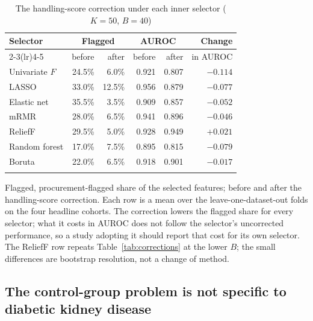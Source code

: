 \documentclass[unnumsec,webpdf,contemporary,large,numbered]{oup-authoring-template}
\begin{document}
\begin{table}[!t]
\caption{The handling-score correction under each inner selector ($K = 50$, $B = 40$)}\label{tab:sweep}
\tabcolsep=1.5pt
\begin{tabular*}{\columnwidth}{@{\extracolsep\fill}lrrrrr@{\extracolsep\fill}}
\toprule
Selector & \multicolumn{2}{c}{Flagged} & \multicolumn{2}{c}{AUROC} & Change \\
\cmidrule(lr){2-3}\cmidrule(lr){4-5}
 & before & after & before & after & in AUROC \\
\midrule
Univariate $F$ & 24.5\% & 6.0\%  & 0.921 & 0.807 & $-0.114$ \\
LASSO          & 33.0\% & 12.5\% & 0.956 & 0.879 & $-0.077$ \\
Elastic net    & 35.5\% & 3.5\%  & 0.909 & 0.857 & $-0.052$ \\
mRMR           & 28.0\% & 6.5\%  & 0.941 & 0.896 & $-0.046$ \\
ReliefF        & 29.5\% & 5.0\%  & 0.928 & 0.949 & $+0.021$ \\
Random forest  & 17.0\% & 7.5\%  & 0.895 & 0.815 & $-0.079$ \\
Boruta         & 22.0\% & 6.5\%  & 0.918 & 0.901 & $-0.017$ \\
\botrule
\end{tabular*}
\begin{tablenotes}%
\item Flagged, procurement-flagged share of the selected features; before and after the handling-score correction. Each row is a mean over the leave-one-dataset-out folds on the four headline cohorts. The correction lowers the flagged share for every selector; what it costs in AUROC does not follow the selector's uncorrected performance, so a study adopting it should report that cost for its own selector. The ReliefF row repeats Table~\ref{tab:corrections} at the lower $B$; the small differences are bootstrap resolution, not a change of method.
\end{tablenotes}
\end{table}

\subsection{The control-group problem is not specific to diabetic kidney disease}\label{sec:external}
\end{document}
